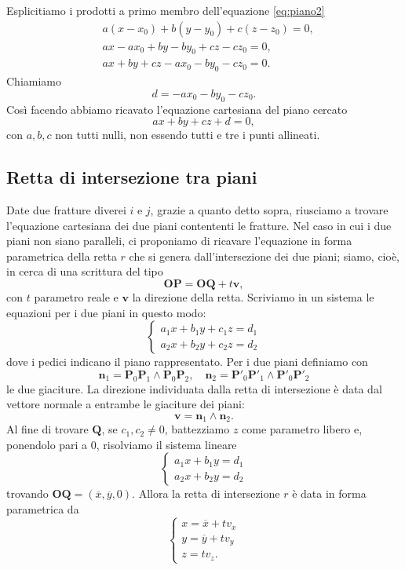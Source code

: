 \documentclass[a4paper]{article}
\newcommand{\B}{\mathbf}
\begin{document}
Esplicitiamo i prodotti a primo membro dell'equazione \eqref{eq:piano2} 
\[
\begin{aligned}
& a\left(x-x_0\right)+b\left(y-y_0\right)+c\left(z-z_0\right)=0, \\
& a x-a x_0+b y-b y_0+c z-c z_0=0, \\
& a x+b y+c z-a x_0-b y_0-c z_0=0.
\end{aligned}
\]
Chiamiamo
$$
d=-a x_0-b y_0-c z_0.
$$ 
Così facendo abbiamo ricavato l'equazione cartesiana del piano cercato 
$$
ax+by+cz+d=0,
$$ 
con $a,b,c$ non tutti nulli, non essendo tutti e tre i punti allineati.

\subsection{Retta di intersezione tra piani}
Date due fratture diverei $i$ e $j$, grazie a quanto detto sopra, riusciamo a trovare l'equazione cartesiana dei due piani contententi le fratture. Nel caso in cui i due piani non siano paralleli, ci proponiamo di ricavare l'equazione in forma parametrica della retta $r$ che si genera dall'intersezione dei due piani; siamo, cioè, in cerca di una scrittura del tipo $$\B{OP}=\B{OQ}+t\B{v},$$ con $t$ parametro reale e $\B{v}$ la direzione della retta. Scriviamo in un sistema le equazioni per i due piani in questo modo: 
$$
\begin{cases}
a_1x+b_1y+c_1z=d_1\\ 
a_2x+b_2y+c_2z=d_2
\end{cases}
$$ 
dove i pedici indicano il piano rappresentato. Per i due piani definiamo con 
$$
\B{n}_1=\B{P}_0\B{P}_1\wedge \B{P}_0\B{P}_2,\quad \B{n}_2 = \B{P}'_0\B{P}'_1\wedge \B{P}'_0\B{P}'_2
$$ 
le due giaciture. La direzione individuata dalla retta di intersezione è data dal vettore normale a entrambe le giaciture dei piani: 
$$
\B{v}=\B{n}_1\wedge \B{n}_2.
$$ 
Al fine di trovare $\B{Q}$, se $c_1,c_2\neq 0$, battezziamo $z$ come parametro libero e, ponendolo pari a $0$, risolviamo il sistema lineare 
$$
\begin{cases}
a_1x+b_1y=d_1\\ 
a_2x+b_2y=d_2
\end{cases}
$$ 
trovando $\B{OQ}=(\overline{x},\overline{y},0)$. Allora la retta di intersezione $r$ è data in forma parametrica da 
$$
\begin{cases}
x=\overline{x}+tv_x \\ 
y=\overline{y}+tv_y \\ 
z=tv_z.
\end{cases}
$$
\end{document}
